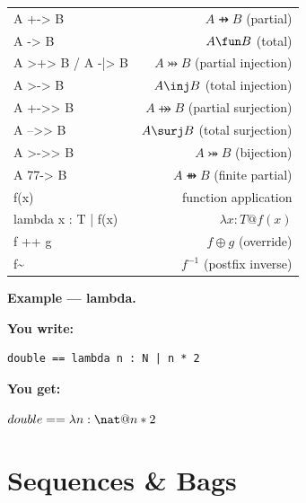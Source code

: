 \documentclass[10pt,landscape,a4paper]{article}
\newenvironment{exwrite}%
  {\par\nobreak\noindent\scriptsize\textbf{You write:}\par\nobreak\vspace{0pt}\scriptsize}%
  {\vspace{1pt}\nobreak}
\newenvironment{exget}%
  {\par\nobreak\noindent\scriptsize\textbf{You get:}\par\nobreak\vspace{0pt}\small}%
  {\par\vspace{3pt}}
\begin{document}
\begin{multicols}{2}
\begin{tabularx}{\columnwidth}{LR}
A +-> B              & $A \pfun B$ (partial) \\
A -> B               & $A \fun B$ (total) \\
A >+> B / A -|> B    & $A \pinj B$ (partial injection) \\
A >-> B              & $A \inj B$ (total injection) \\
A +->> B             & $A \psurj B$ (partial surjection) \\
A -->> B             & $A \surj B$ (total surjection) \\
A >->> B             & $A \bij B$ (bijection) \\
A 77-> B             & $A \ffun B$ (finite partial) \\
f(x)                 & function application \\
lambda x : T | f(x)  & $\lambda x : T @ f(x)$ \\
f ++ g               & $f \oplus g$ (override) \\
f\textasciitilde     & $f^{-1}$ (postfix inverse) \\
\end{tabularx}

\smallskip
{}
\textbf{Example — lambda.}

\begin{exwrite}%
\begin{verbatim}
double == lambda n : N | n * 2
\end{verbatim}
\end{exwrite}
\begin{exget}%
\begin{center}
$double == \lambda n : \nat @ n * 2$
\end{center}
\end{exget}

\section{Sequences \& Bags}


\end{multicols}
\end{document}
